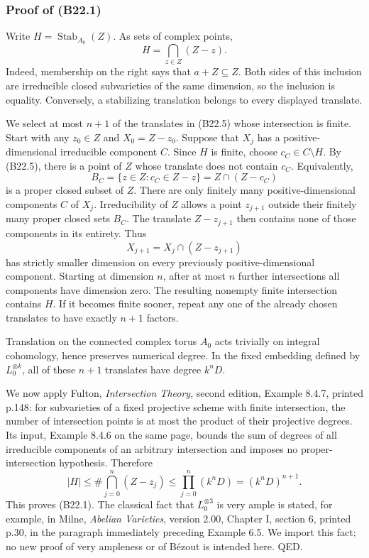 \documentclass[11pt,a4paper]{article}
\theoremstyle{definition}
\begin{document}
\subsubsection{Proof of (B22.1)}\label{proof-of-b22.1}

Write \(H=\operatorname{Stab}_{A_0}(Z)\). As sets of complex points, \[
 H=\bigcap_{z\in Z}(Z-z).
\tag{B22.5}
\] Indeed, membership on the right says that \(a+Z\subseteq Z\). Both sides of this inclusion are irreducible closed subvarieties of the same dimension, so the inclusion is equality. Conversely, a stabilizing translation belongs to every displayed translate.

We select at most \(n+1\) of the translates in (B22.5) whose intersection is finite. Start with any \(z_0\in Z\) and \(X_0=Z-z_0\). Suppose that \(X_j\) has a positive-dimensional irreducible component \(C\). Since \(H\) is finite, choose \(c_C\in C\setminus H\). By (B22.5), there is a point of \(Z\) whose translate does not contain \(c_C\). Equivalently, \[
 B_C=\{z\in Z:c_C\in Z-z\}=Z\cap(Z-c_C)
\] is a proper closed subset of \(Z\). There are only finitely many positive-dimensional components \(C\) of \(X_j\). Irreducibility of \(Z\) allows a point \(z_{j+1}\) outside their finitely many proper closed sets \(B_C\). The translate \(Z-z_{j+1}\) then contains none of those components in its entirety. Thus \[
 X_{j+1}=X_j\cap(Z-z_{j+1})
\] has strictly smaller dimension on every previously positive-dimensional component. Starting at dimension \(n\), after at most \(n\) further intersections all components have dimension zero. The resulting nonempty finite intersection contains \(H\). If it becomes finite sooner, repeat any one of the already chosen translates to have exactly \(n+1\) factors.

Translation on the connected complex torus \(A_0\) acts trivially on integral cohomology, hence preserves numerical degree. In the fixed embedding defined by \(L_0^{\otimes k}\), all of these \(n+1\) translates have degree \(k^nD\).

We now apply Fulton, \emph{Intersection Theory}, second edition, Example 8.4.7, printed p.148: for subvarieties of a fixed projective scheme with finite intersection, the number of intersection points is at most the product of their projective degrees. Its input, Example 8.4.6 on the same page, bounds the sum of degrees of all irreducible components of an arbitrary intersection and imposes no proper-intersection hypothesis. Therefore \[
 |H|\le\#\bigcap_{j=0}^{n}(Z-z_j)
 \le\prod_{j=0}^{n}(k^nD)=(k^nD)^{n+1}.
\] This proves (B22.1). The classical fact that \(L_0^{\otimes3}\) is very ample is stated, for example, in Milne, \emph{Abelian Varieties}, version 2.00, Chapter I, section 6, printed p.30, in the paragraph immediately preceding Example 6.5. We import this fact; no new proof of very ampleness or of Bézout is intended here. QED.
\end{document}
